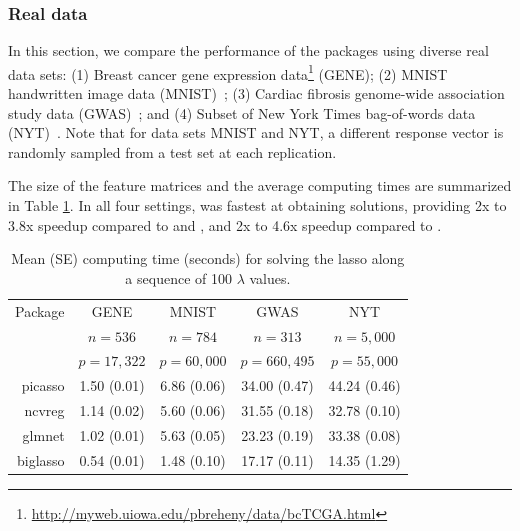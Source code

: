 \subsubsection{Real data}


In this section, we compare the performance of the packages using diverse real data sets: (1) Breast cancer gene expression data\footnote{\url{http://myweb.uiowa.edu/pbreheny/data/bcTCGA.html}} (GENE); (2) MNIST handwritten image data (MNIST)~\citep{lecun1998gradient}; (3) Cardiac fibrosis genome-wide association study data (GWAS)~\citep{breheny2016marginal}; and (4) Subset of New York Times bag-of-words data (NYT)~\citep{Dua:2017}. Note that for data sets MNIST and NYT, a different response vector is randomly sampled from a test set at each replication.


The size of the feature matrices and the average computing times are summarized in Table \ref{tab_real_res}. In all four settings,  was fastest at obtaining solutions, providing 2x to 3.8x speedup compared to  and , and 2x to 4.6x speedup compared to .

\begin{table}[h] 
\centering
\begin{tabular}{r|cccc}
\toprule
Package & GENE & MNIST & GWAS & NYT \\
 & $n=536$ & $n=784$ & $n=313$ & $n=5,000$ \\
 & $p=17,322$ & $p=60,000$ & $p=660,495$ & $p=55,000$ \\
\midrule
picasso & 1.50 (0.01) & 6.86 (0.06) & 34.00 (0.47) & 44.24 (0.46) \\
ncvreg & 1.14 (0.02) & 5.60 (0.06) & 31.55 (0.18) & 32.78 (0.10) \\
glmnet & 1.02 (0.01) & 5.63 (0.05) & 23.23 (0.19) & 33.38 (0.08) \\
biglasso & 0.54 (0.01) & 1.48 (0.10) & 17.17 (0.11) & 14.35 (1.29) \\
\bottomrule
\end{tabular}
\caption{Mean (SE) computing time (seconds) for solving the lasso along a sequence of 100 $\lambda$ values.}
\label{tab_real_res}
\end{table}

